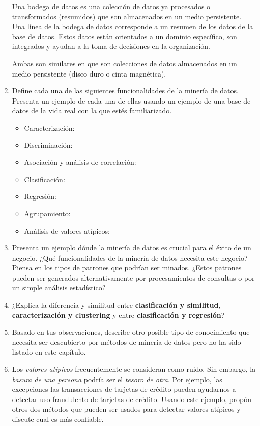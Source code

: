 \documentclass{article}
\begin{document}
\begin{enumerate}
\textcolor{NavyBlue}{Una bodega de datos es una colección de datos ya procesados
o transformados (resumidos) que son almacenados en un medio persistente. Una
línea de la bodega de datos corresponde a un resumen de los datos de la base de
datos. Estos datos están orientados a un dominio específico, son integrados y
ayudan a la toma de decisiones en la organización.}

Ambas son similares en que son colecciones de datos almacenados en un medio
persistente (disco duro o cinta magnética).

\pagebreak
\item Define cada una de las siguientes funcionalidades de la minería de datos.
Presenta un ejemplo de cada una de ellas usando un ejemplo de una base de datos
de la vida real con la que estés familiarizado.

\begin{itemize}
    \item Caracterización:
    \item Discriminación:
    \item Asociación y análisis de correlación:
    \item Clasificación:
    \item Regresión:
    \item Agrupamiento:
    \item Análisis de valores atípicos:
\end{itemize}

\pagebreak
\item Presenta un ejemplo dónde la minería de datos es crucial para el éxito de
un negocio. ¿Qué funcionalidades de la minería de datos necesita este negocio?
Piensa en los tipos de patrones que podrían ser minados. ¿Estos patrones pueden
ser generados alternativamente por procesamientos de consultas o por un simple
análisis estadístico?

\pagebreak
\item ¿Explica la diferencia y similitud entre \textbf{clasificación y
similitud}, \textbf{caracterización y clustering} y entre \textbf{clasificación
y regresión}?

\pagebreak
\item Basado en tus observaciones, describe otro posible tipo de conocimiento
que necesita ser descubierto por métodos de minería de datos pero no ha sido
listado en este capítulo.------

\pagebreak
\item Los \textit{valores atípicos} frecuentemente se consideran como ruido. Sin
embargo, la \textit{basura de una persona} podría ser el \textit{tesoro de
otra}. Por ejemplo, las excepciones las transacciones de tarjetas de crédito
pueden ayudarnos a detectar uso fraudulento de tarjetas de crédito. Usando este
ejemplo, propón otros dos métodos que pueden ser usados para detectar valores
atípicos y discute cual es más confiable.


\end{enumerate}
\end{document}
